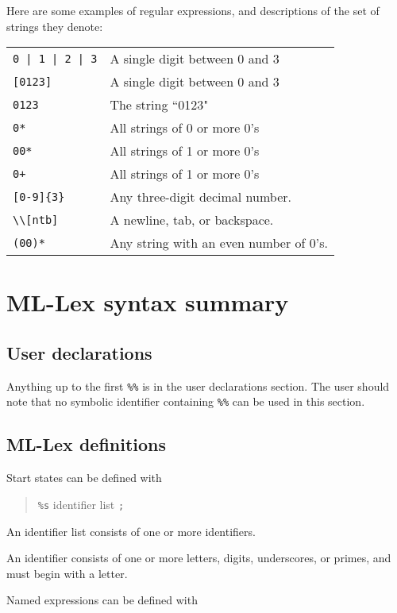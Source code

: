 Here are some examples of regular expressions, and descriptions of the
set of strings they denote:

\begin{tabular}{ll}
\verb~0 | 1 | 2 | 3~&           A single digit between 0 and 3\\
\verb|[0123]|&                  A single digit between 0 and 3\\
\verb|0123|&                    The string ``0123"\\
\verb|0*|&                      All strings of 0 or more 0's\\
\verb|00*|&                     All strings of 1  or more 0's\\
\verb|0+|&                      All strings of 1  or more 0's\\
\verb|[0-9]{3}|&                Any three-digit decimal number.\\
\verb|\\[ntb]|&                 A newline, tab, or backspace.\\
\verb|(00)*|& Any string with an even number of 0's.
\end{tabular}

\section{ML-Lex syntax summary}

\subsection{User declarations}

Anything up to the first \verb|%%| is in the user declarations section.  The
user should note that no symbolic identifier containing 
\verb|%%| can be
used in this section.

\subsection{ML-Lex definitions}

Start states can be defined with
\begin{quote}
\verb|%s| {identifier list} \verb|;|
\end{quote}

An identifier list consists of one or more identifiers.

An identifier consists of one or more letters, digits, underscores,
or primes, and must begin with a letter.

Named expressions can be defined with

